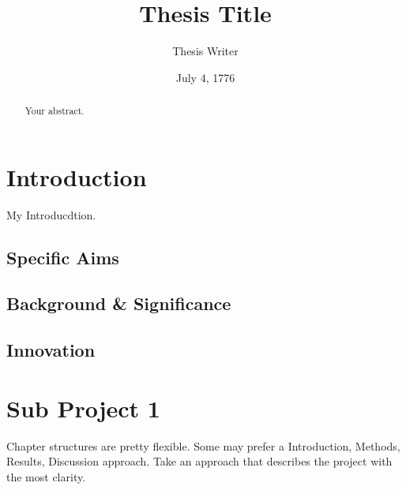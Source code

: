 \documentclass[10pt,hyperref,normalmargins]{ucdthesis}
\title{Thesis Title}
\author{Thesis Writer}
\date{July 4, 1776}
\begin{document}


\begin{preliminary}
    \begin{abstract}
        Your abstract. 
    \end{abstract}

    \contents
%
\end{preliminary}




\chapter{Introduction}
My Introducdtion.

\section{Specific Aims}

\section{Background \& Significance}


\section{Innovation}

\chapter{Sub Project 1}
Chapter structures are pretty flexible. Some may prefer a Introduction, Methods, Results, Discussion approach. Take an approach that describes the project with the most clarity. 
\end{document}
